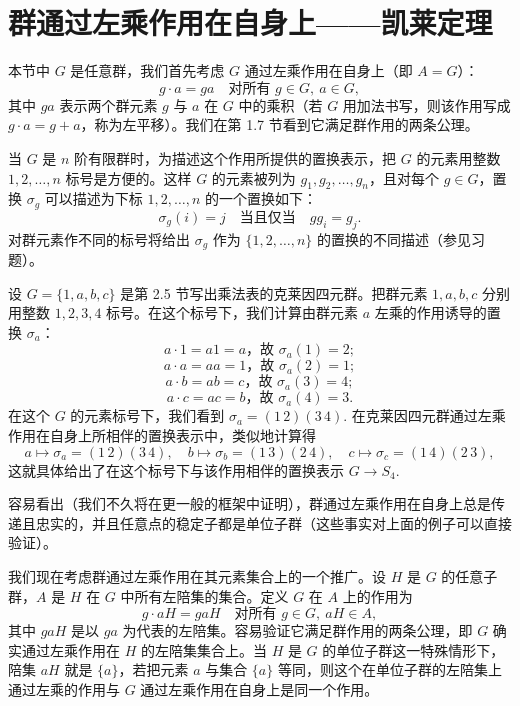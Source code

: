 \section{群通过左乘作用在自身上——凯莱定理}

本节中 \(G\) 是任意群，我们首先考虑 \(G\) 通过左乘作用在自身上（即 \(A = G\)）：
\[
g \cdot a = ga \quad \text{对所有 } g \in G,\ a \in G,
\]
其中 \(ga\) 表示两个群元素 \(g\) 与 \(a\) 在 \(G\) 中的乘积（若 \(G\) 用加法书写，则该作用写成 \(g \cdot a = g + a\)，称为左平移）。我们在第 1.7 节看到它满足群作用的两条公理。

当 \(G\) 是 \(n\) 阶有限群时，为描述这个作用所提供的置换表示，把 \(G\) 的元素用整数 \(1, 2, \ldots, n\) 标号是方便的。这样 \(G\) 的元素被列为 \(g_1, g_2, \ldots, g_n\)，且对每个 \(g \in G\)，置换 \(\sigma_g\) 可以描述为下标 \(1, 2, \ldots, n\) 的一个置换如下：
\[
\sigma_g(i) = j \quad \text{当且仅当} \quad g g_i = g_j.
\]
对群元素作不同的标号将给出 \(\sigma_g\) 作为 \(\{1, 2, \ldots, n\}\) 的置换的不同描述（参见习题）。

\begin{example}
设 \(G = \{1, a, b, c\}\) 是第 2.5 节写出乘法表的克莱因四元群。把群元素 \(1, a, b, c\) 分别用整数 \(1, 2, 3, 4\) 标号。在这个标号下，我们计算由群元素 \(a\) 左乘的作用诱导的置换 \(\sigma_a\)：
\[
a \cdot 1 = a1 = a \text{，故 } \sigma_a(1) = 2;
\]
\[
a \cdot a = aa = 1 \text{，故 } \sigma_a(2) = 1;
\]
\[
a \cdot b = ab = c \text{，故 } \sigma_a(3) = 4;
\]
\[
a \cdot c = ac = b \text{，故 } \sigma_a(4) = 3.
\]
在这个 \(G\) 的元素标号下，我们看到 \(\sigma_a = (1\,2)(3\,4)\). 在克莱因四元群通过左乘作用在自身上所相伴的置换表示中，类似地计算得
\[
a \mapsto \sigma_a = (1\,2)(3\,4), \quad b \mapsto \sigma_b = (1\,3)(2\,4), \quad c \mapsto \sigma_c = (1\,4)(2\,3),
\]
这就具体给出了在这个标号下与该作用相伴的置换表示 \(G \to S_4\).
\end{example}

容易看出（我们不久将在更一般的框架中证明），群通过左乘作用在自身上总是传递且忠实的，并且任意点的稳定子都是单位子群（这些事实对上面的例子可以直接验证）。

我们现在考虑群通过左乘作用在其元素集合上的一个推广。设 \(H\) 是 \(G\) 的任意子群，\(A\) 是 \(H\) 在 \(G\) 中所有左陪集的集合。定义 \(G\) 在 \(A\) 上的作用为
\[
g \cdot aH = gaH \quad \text{对所有 } g \in G,\ aH \in A,
\]
其中 \(gaH\) 是以 \(ga\) 为代表的左陪集。容易验证它满足群作用的两条公理，即 \(G\) 确实通过左乘作用在 \(H\) 的左陪集集合上。当 \(H\) 是 \(G\) 的单位子群这一特殊情形下，陪集 \(aH\) 就是 \(\{a\}\)，若把元素 \(a\) 与集合 \(\{a\}\) 等同，则这个在单位子群的左陪集上通过左乘的作用与 \(G\) 通过左乘作用在自身上是同一个作用。

